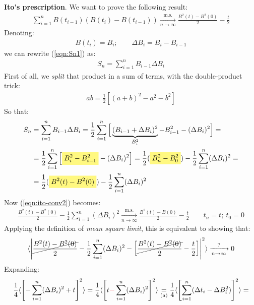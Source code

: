 \documentclass[../template.tex]{subfiles}
\begin{document}
\begin{example}
    \textbf{Ito's prescription}.  
    We want to prove the following result:
    \begin{align}
        \sum_{i=1}^n B(t_{i-1}) (B(t_i) - B(t_{i-1}))  \xrightarrow[n \to \infty]{\mathrm{m.s.}} \frac{B^2(t)- B^2(0)}{2} - \frac{t}{2}    \label{eqn:ito-conv1}
    \end{align}
    Denoting:
    \begin{align*}
        B(t_i) = B_i; \qquad \Delta B_i = B_{i} - B_{i-1}
    \end{align*}
    we can rewrite (\ref{eqn:Sn1}) as:
    \begin{align*}
        S_n = \sum_{i=1}^n B_{i-1} \Delta B_i
    \end{align*}
    First of all, we \textit{split} that product in a sum of terms, with the double-product trick:
    \begin{align*}
        ab = \frac{1}{2}[(a+b)^2 - a^2 - b^2] 
    \end{align*}
    So that:
    \begin{align*}
        S_n &= \sum_{i=1}^{n} B_{i-1} \Delta B_i = \frac{1}{2} \sum_{i=1}^{n} \Big[\underbrace{(B_{i-1} + \Delta B_i)^2}_{B_i^2} - B_{i-1}^2 - (\Delta B_i)^2\Big] = \\
        &= \frac{1}{2} \sum_{i=1}^{n} \left[\hlc{Yellow}{B_i^2 - B_{i-1}^2 }- (\Delta B_i)^2\right] = \frac{1}{2} (\hlc{Yellow}{B_n^2 - B_0^2}) - \frac{1}{2} \sum_{i=1}^n (\Delta B_i)^2 = \\
        &= \frac{1}{2} (\hlc{Yellow}{B^2(t) - B^2(0)}) - \frac{1}{2} \sum_{i=1}^n (\Delta B_i)^2 
    \end{align*}
    Now (\ref{eqn:ito-conv2}) becomes:
    \begin{align*}
        \frac{B^2(t) - B^2(0)}{2} - \frac{1}{2} \sum_{i=1}^n (\Delta B_i)^2  \xrightarrow[n \to \infty]{\mathrm{m.s.} } \frac{B^2(t)-B(0)}{2} - \frac{t}{2} \qquad t_n = t; \> t_0 = 0
    \end{align*}
    Applying the definition of \textit{mean square limit}, this is equivalent to showing that: 
    \begin{align} \label{eqn:ito-conv-def}
       \langle \left| \cancel{\frac{B^2(t) - B^2(0)}{2} }- \frac{1}{2} \sum_{i=1}^n (\Delta B_i)^2 - \left[\cancel{\frac{B^2(t)-B^2(0)}{2}} - \frac{t}{2}  \right]   \right|^2 \rangle  \xrightarrow[n \to \infty]{?}  0
    \end{align}
    Expanding:
    \begin{align} \nonumber
        \frac{1}{4} \langle \left[-\sum_{i=1}^n (\Delta B_i)^2 + t \right]^2 \rangle &= \frac{1}{4} \langle \left[t \textcolor{Red}{-} \sum_{i=1}^n (\Delta B_i)^2 \right]^2 \rangle \underset{(a)}{=}  \frac{1}{4} \langle \left[\sum_{i=1}^n (\Delta t_i - \Delta B_i^2)\right]^2 \rangle =\\

\end{align}
\end{example}
\end{document}
